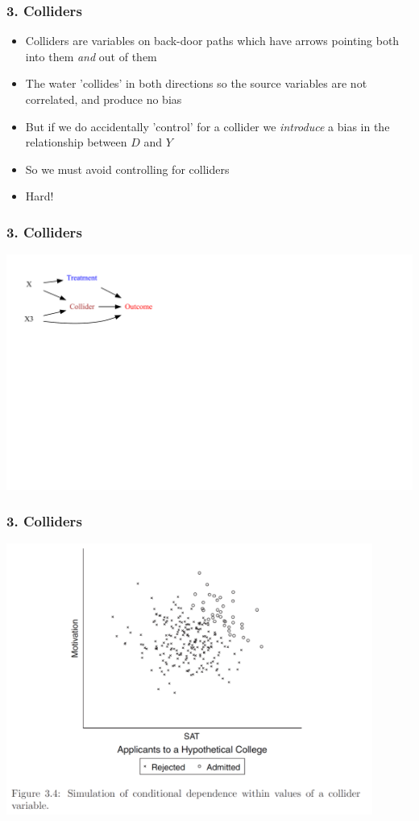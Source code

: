 \documentclass[xcolor=x11names,compress]{beamer}\usepackage[]{graphicx}\usepackage[]{color}
\newenvironment{knitrout}{}{} %
\renewcommand{\(}{\begin{columns}}
\renewcommand{\)}{\end{columns}}
\newcommand{\<}[1]{\begin{column}{#1}}
\renewcommand{\>}{\end{column}}
\begin{document}
\begin{frame}
\frametitle{3. Colliders}
\begin{itemize}
\item Colliders are variables on back-door paths which have arrows pointing both into them \textit{and} out of them
\pause
\item The water 'collides' in both directions so the source variables are not correlated, and produce no bias
\pause
\item But if we do accidentally 'control' for a collider we \textit{introduce} a bias in the relationship between $D$ and $Y$
\pause
\item So we must avoid controlling for colliders
\pause
\item Hard!
\end{itemize}
\end{frame}

\begin{frame}
\frametitle{3. Colliders}
\begin{knitrout}
\color{fgcolor}
\includegraphics[width=2.7\linewidth]{figure/Dag5-1} 

\end{knitrout}
\end{frame}

\begin{frame}
\frametitle{3. Colliders}
\includegraphics[width=0.9\textwidth]{Collider.png}
\end{frame}
\end{document}
